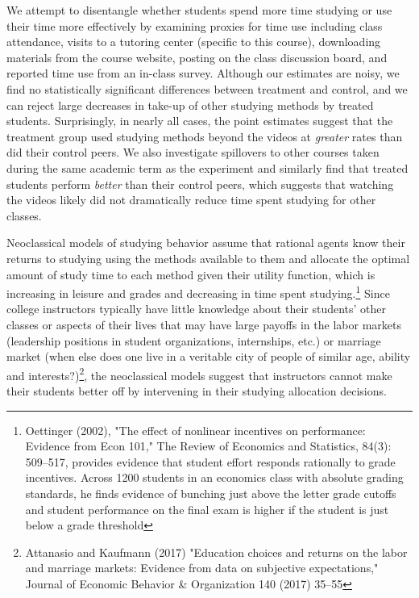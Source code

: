 \documentclass[12pt]{article}
\begin{document}
We attempt to disentangle whether students spend more time studying or use their time more effectively by examining proxies for time use including class attendance, visits to a tutoring center (specific to this course), downloading materials from the course website, posting on the class discussion board, and reported time use from an in-class survey. Although our estimates are noisy, we find no statistically significant differences between treatment and control, and we can reject large decreases in take-up of other studying methods by treated students. Surprisingly, in nearly all cases, the point estimates suggest that the treatment group used studying methods beyond the videos at \textit{greater} rates than did their control peers. We also investigate spillovers to other courses taken during the same academic term as the experiment and similarly find that treated students perform \textit{better} than their control peers, which suggests that watching the videos likely did not dramatically reduce time spent studying for other classes.


Neoclassical models of studying behavior assume that rational agents know their returns to studying using the methods available to them and allocate the optimal amount of study time to each method given their utility function, which is increasing in leisure and grades and decreasing in time spent studying.\footnote{Oettinger (2002), "The effect of nonlinear incentives on performance: Evidence from Econ 101," The Review of Economics and Statistics, 84(3): 509–517, provides evidence that student effort responds rationally to grade incentives.  Across 1200 students in an economics class with absolute grading standards, he finds evidence of bunching just above the letter grade cutoffs and student performance on the final exam is higher if the student is just below a grade threshold} Since college instructors typically have little knowledge about their students' other classes or aspects of their lives that may have large payoffs in the labor markets (leadership positions in student organizations, internships, etc.) or marriage market (when else does one live in a veritable city of people of similar age, ability and interests?)\footnote{Attanasio and Kaufmann (2017) "Education choices and returns on the labor and marriage markets: Evidence from data on subjective expectations," Journal of Economic Behavior \& Organization 140 (2017) 35–55}, the neoclassical models suggest that instructors cannot make their students better off by intervening in their studying allocation decisions.
\end{document}
